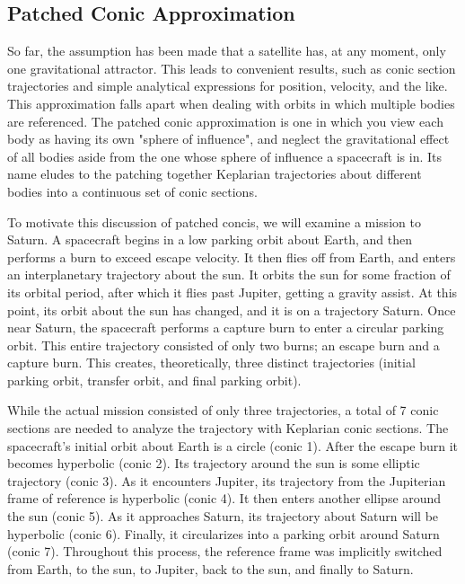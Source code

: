 \documentclass[../basicOrbitalDynamics.tex]{subfiles}
\begin{document}
\bigskip\bigskip
\subsection{Patched Conic Approximation}\label{sec:Patched Conics}

So far, the assumption has been made that a satellite has, at any moment, only one gravitational attractor. This leads to convenient results, such as conic section trajectories and simple analytical expressions for position, velocity, and the like. This approximation falls apart when dealing with orbits in which multiple bodies are referenced. The patched conic approximation is one in which you view each body as having its own "sphere of influence", and neglect the gravitational effect of all bodies aside from the one whose sphere of influence a spacecraft is in. Its name eludes to the patching together Keplarian trajectories about different bodies into a continuous set of conic sections.

To motivate this discussion of patched concis, we will examine a mission to Saturn. A spacecraft begins in a low parking orbit about Earth, and then performs a burn to exceed escape velocity. It then flies off from Earth, and enters an interplanetary trajectory about the sun. It orbits the sun for some fraction of its orbital period, after which it flies past Jupiter, getting a gravity assist. At this point, its orbit about the sun has changed, and it is on a trajectory Saturn. Once near Saturn, the spacecraft performs a capture burn to enter a circular parking orbit. This entire trajectory consisted of only two burns; an escape burn and a capture burn. This creates, theoretically, three distinct trajectories (initial parking orbit, transfer orbit, and final parking orbit).

While the actual mission consisted of only three trajectories, a total of 7 conic sections are needed to analyze the trajectory with Keplarian conic sections. The spacecraft's initial orbit about Earth is a circle (conic 1). After the escape burn it becomes hyperbolic (conic 2). Its trajectory around the sun is some elliptic trajectory (conic 3). As it encounters Jupiter, its trajectory from the Jupiterian frame of reference is hyperbolic (conic 4). It then enters another ellipse around the sun (conic 5). As it approaches Saturn, its trajectory about Saturn will be hyperbolic (conic 6). Finally, it circularizes into a parking orbit around Saturn (conic 7). Throughout this process, the reference frame was implicitly switched from Earth, to the sun, to Jupiter, back to the sun, and finally to Saturn.
\end{document}
